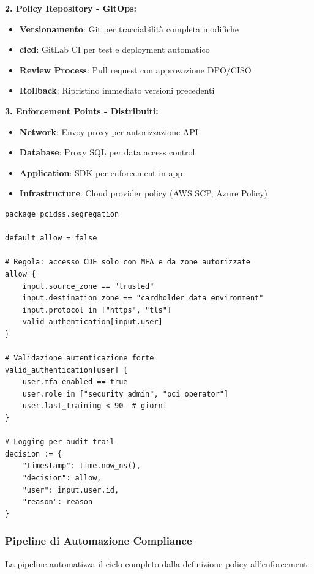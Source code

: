 \textbf{2. Policy Repository - GitOps:}
\begin{itemize}
    \item \textbf{Versionamento}: Git per tracciabilità completa modifiche
    \item \textbf{\gls{cicd}}: GitLab CI per test e deployment automatico
    \item \textbf{Review Process}: Pull request con approvazione DPO/CISO
    \item \textbf{Rollback}: Ripristino immediato versioni precedenti
\end{itemize}

\textbf{3. Enforcement Points - Distribuiti:}
\begin{itemize}
    \item \textbf{Network}: Envoy proxy per autorizzazione API
    \item \textbf{Database}: Proxy SQL per data access control
    \item \textbf{Application}: SDK per enforcement in-app
    \item \textbf{Infrastructure}: Cloud provider policy (AWS SCP, Azure Policy)
\end{itemize}

\begin{lstlisting}[caption={Policy Rego per Segregazione Dati PCI},label={lst:rego_pci}]
package pcidss.segregation

default allow = false

# Regola: accesso CDE solo con MFA e da zone autorizzate
allow {
    input.source_zone == "trusted"
    input.destination_zone == "cardholder_data_environment"
    input.protocol in ["https", "tls"]
    valid_authentication[input.user]
}

# Validazione autenticazione forte
valid_authentication[user] {
    user.mfa_enabled == true
    user.role in ["security_admin", "pci_operator"]
    user.last_training < 90  # giorni
}

# Logging per audit trail
decision := {
    "timestamp": time.now_ns(),
    "decision": allow,
    "user": input.user.id,
    "reason": reason
}
\end{lstlisting}

\subsubsection{Pipeline di Automazione Compliance}

La pipeline automatizza il ciclo completo dalla definizione policy all'enforcement:

